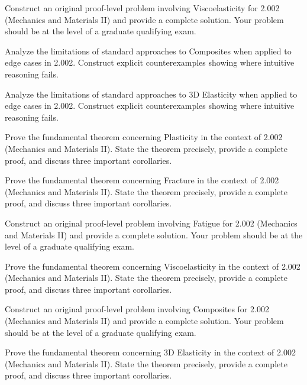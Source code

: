 \documentclass[12pt,a4paper]{exam}
\begin{document}
\begin{questions}
\vspace{0.3cm}

\question[6]
Construct an original proof-level problem involving Viscoelasticity for 2.002 (Mechanics and Materials II) and provide a complete solution. Your problem should be at the level of a graduate qualifying exam.

\vspace{0.3cm}

\question[3]
Analyze the limitations of standard approaches to Composites when applied to edge cases in 2.002. Construct explicit counterexamples showing where intuitive reasoning fails.

\vspace{0.3cm}

\question[4]
Analyze the limitations of standard approaches to 3D Elasticity when applied to edge cases in 2.002. Construct explicit counterexamples showing where intuitive reasoning fails.

\vspace{0.3cm}

\question[3]
Prove the fundamental theorem concerning Plasticity in the context of 2.002 (Mechanics and Materials II). State the theorem precisely, provide a complete proof, and discuss three important corollaries.

\vspace{0.3cm}

\question[6]
Prove the fundamental theorem concerning Fracture in the context of 2.002 (Mechanics and Materials II). State the theorem precisely, provide a complete proof, and discuss three important corollaries.

\vspace{0.3cm}

\question[3]
Construct an original proof-level problem involving Fatigue for 2.002 (Mechanics and Materials II) and provide a complete solution. Your problem should be at the level of a graduate qualifying exam.

\vspace{0.3cm}

\question[3]
Prove the fundamental theorem concerning Viscoelasticity in the context of 2.002 (Mechanics and Materials II). State the theorem precisely, provide a complete proof, and discuss three important corollaries.

\vspace{0.3cm}

\question[3]
Construct an original proof-level problem involving Composites for 2.002 (Mechanics and Materials II) and provide a complete solution. Your problem should be at the level of a graduate qualifying exam.

\vspace{0.3cm}

\question[3]
Prove the fundamental theorem concerning 3D Elasticity in the context of 2.002 (Mechanics and Materials II). State the theorem precisely, provide a complete proof, and discuss three important corollaries.

\vspace{0.3cm}

\end{questions}
\end{document}
